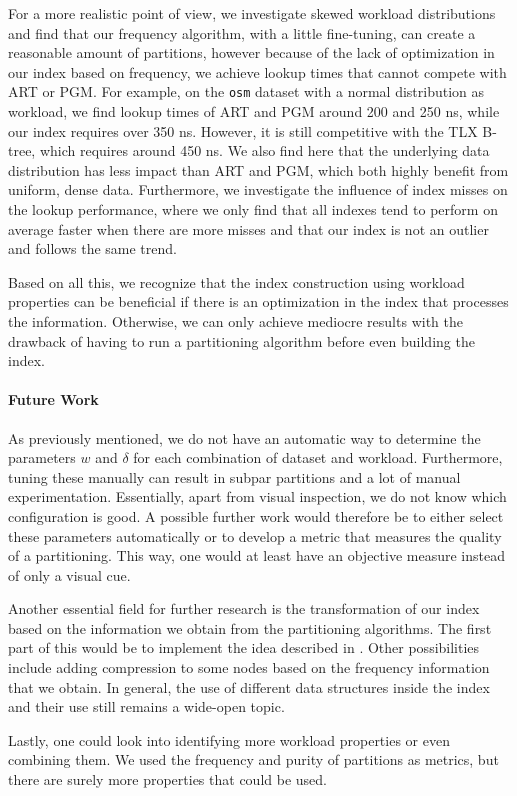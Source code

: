 For a more realistic point of view, we investigate skewed workload distributions and find that our frequency algorithm, with a little fine-tuning, can create a reasonable amount of partitions, however because of the lack of optimization in our index based on frequency, we achieve lookup times that cannot compete with ART or PGM. For example, on the \verb|osm| dataset with a normal distribution as workload, we find lookup times of ART and PGM around 200 and 250 ns, while our index requires over 350 ns. However, it is still competitive with the TLX B-tree, which requires around 450 ns. We also find here that the underlying data distribution has less impact than ART and PGM, which both highly benefit from uniform, dense data. Furthermore, we investigate the influence of index misses on the lookup performance, where we only find that all indexes tend to perform on average faster when there are more misses and that our index is not an outlier and follows the same trend.

Based on all this, we recognize that the index construction using workload properties can be beneficial if there is an optimization in the index that processes the information. Otherwise, we can only achieve mediocre results with the drawback of having to run a partitioning algorithm before even building the index.

\paragraph{Future Work}
As previously mentioned, we do not have an automatic way to determine the parameters $w$ and $\delta$ for each combination of dataset and workload. Furthermore, tuning these manually can result in subpar partitions and a lot of manual experimentation. Essentially, apart from visual inspection, we do not know which configuration is good. A possible further work would therefore be to either select these parameters automatically or to develop a metric that measures the quality of a partitioning. This way, one would at least have an objective measure instead of only a visual cue. 

Another essential field for further research is the transformation of our index based on the information we obtain from the partitioning algorithms. The first part of this would be to implement the idea described in . Other possibilities include adding compression to some nodes based on the frequency information that we obtain. In general, the use of different data structures inside the index and their use still remains a wide-open topic. 

Lastly, one could look into identifying more workload properties or even combining them. We used the frequency and purity of partitions as metrics, but there are surely more properties that could be used.